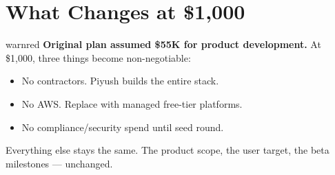 \documentclass[12pt, a4paper]{article}
\begin{document}
\tableofcontents
\newpage

\section{What Changes at \$1,000}

\begin{insightbox}{warnred}
\textbf{Original plan assumed \$55K for product development.}
At \$1,000, three things become non-negotiable:
\begin{itemize}[leftmargin=1.2em, itemsep=0.1em]
    \item No contractors. Piyush builds the entire stack.
    \item No AWS. Replace with managed free-tier platforms.
    \item No compliance/security spend until seed round.
\end{itemize}
Everything else stays the same. The product scope, the user target, the beta milestones --- unchanged.
\end{insightbox}

\vspace{0.8em}
\end{document}

